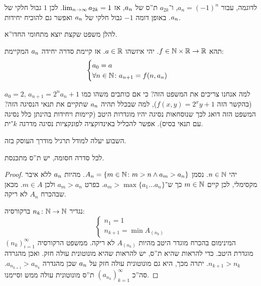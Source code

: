 \documentclass[name=רשימות חשבון דיפרנציאלי ואינטגרלי 1א]{../../../tex/classes/megasumPreamble}
\begin{document}
	לדוגמה, עבור $a_n = (-1)^{n}$, ו־$a_{2k}$ ת''ס של $a_n$, אז $\lim_{n \to \infty} a_{2k} = 1$. לכן $1$ גבול חלקי של $a_n$. באופן דומה $-1$ גבול חלקי של $a_n$ ואפשר גם להוכיח יחידות.


	להלן משפט שקצת יוצא מתחומי החדו''א.
	\begin{Theorem}
		תהא $f \in \mathbb{N} \times \mathbb{R} \to \mathbb{R}$. יהי איזשהו $a \in \mathbb{R}$. אז קיימת סדרה יחידה $a_n$ המקיימת:
		\[ \begin{cases}
			a_0 = a \\
			\forall n \in \mathbb{N} \colon a_{n + 1} = f(n, a_{n})
		\end{cases} \]
	\end{Theorem}
	למה אנחנו צריכים את המשפט הזה? כי אם כותבים משהו כמו $a_0 = 2, \, a_{n + 1} = 2^{n}a_n + 1$ (בהקשר הזה $f(x, y) = 2^{x} y + 1$), למה שבכלל תהיה $a_n$ שתקיים את תנאי הנסיגה הזה? המשפט הזה דואג לכך שנוסחאות נסיגה יהיו מוגדרות היטב (קיימות ויחידות בהינתן כלל נסיגה עם תנאי בסיס). אפשר להכליל באינדוקציה לפונקציות נסיגה מדרגה $k$־ית.

	השבוע יעלה למודל תרגיל מודרך העוסק בזה.

	\begin{Theorem}
		לכל סדרה חסומה, יש ת''ס מתכנסת.
	\end{Theorem}
	\begin{proof}
		יהי $n \in \mathbb{N}$. נסמן $A_n = \{m \in \mathbb{N} \colon m> n \land a_m > a_n\}$. מהיות $a_n$ ללא איבר מקסימלי, לכן קיים $m \in \mathbb{N}$ כך ש־$a_m > \max\{a_1 \dots a_n\}$. בפרט $a_m > a_n$ ולכן $m \in A$. מכאן שבהכרח $A_n$ לא ריקה.

		נגדיר $n_k \colon \mathbb{N}\to \mathbb{N}$ ברקורסיה:
		\[ \begin{cases}
			n_1 = 1 \\
			n_{k + 1} = \min A_{(n_k)}
		\end{cases} \]
		המינימום בהכרח מוגדר היטב מהיות $A_{(n_k)}$ לא ריקה. ממשפט הרקורסיה $(n_k)_{i = 1}^{\infty}$ מוגדרת היטב. כדי להראות שהיא ת''ס, יש להראות שהיא מונוטונית עולה חזק. ואכן מהגרדה $n_{k + 1} > n_k$. יתרה מכך, היא גם מונוטונית עולה חזק על $a_n$ שכן מהגדרה $a_{n_{k + 1}} > a_{n_k}$. סה''כ $(a_{n_k})_{k = 1}^{\infty}$ ת''ס מונוטונית עולה ממש וסיימנו.
	\end{proof}
\end{document}
